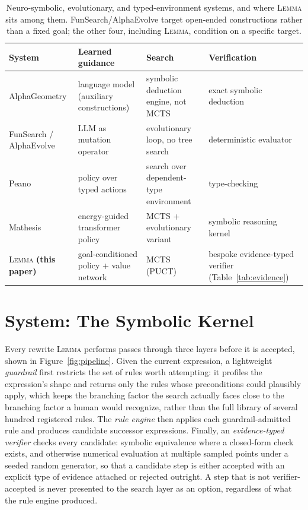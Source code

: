 \documentclass[11pt]{article}
\numberwithin{equation}{section}
\newcommand{\lemma}{\textsc{Lemma}}
\begin{document}
\begin{table}[htbp]
\centering
\small
\begin{tabular}{@{}p{3.4cm}p{3.6cm}p{3.6cm}p{3.6cm}@{}}
\toprule
System & Learned guidance & Search & Verification \\
\midrule
AlphaGeometry \citep{trinh2024alphageometry} & language model (auxiliary constructions) & symbolic deduction engine, not MCTS & exact symbolic deduction \\
FunSearch / AlphaEvolve \citep{romeraparedes2024funsearch,novikov2025alphaevolve} & LLM as mutation operator & evolutionary loop, no tree search & deterministic evaluator \\
Peano \citep{poesia2023peano} & policy over typed actions & search over dependent-type environment & type-checking \\
Mathesis \citep{xie2026mathesis} & energy-guided transformer policy & MCTS + evolutionary variant & symbolic reasoning kernel \\
\lemma{} \textbf{(this paper)} & goal-conditioned policy + value network & MCTS (PUCT) & bespoke evidence-typed verifier (Table~\ref{tab:evidence}) \\
\bottomrule
\end{tabular}
\caption{Neuro-symbolic, evolutionary, and typed-environment systems, and where \lemma{} sits among them. FunSearch/AlphaEvolve target open-ended constructions rather than a fixed goal; the other four, including \lemma{}, condition on a specific target.}
\label{tab:comparison}
\end{table}

\section{System: The Symbolic Kernel}
\label{sec:kernel}

Every rewrite \lemma{} performs passes through three layers before it is accepted, shown in Figure~\ref{fig:pipeline}. Given the current expression, a lightweight \emph{guardrail} first restricts the set of rules worth attempting: it profiles the expression's shape and returns only the rules whose preconditions could plausibly apply, which keeps the branching factor the search actually faces close to the branching factor a human would recognize, rather than the full library of several hundred registered rules. The \emph{rule engine} then applies each guardrail-admitted rule and produces candidate successor expressions. Finally, an \emph{evidence-typed verifier} checks every candidate: symbolic equivalence where a closed-form check exists, and otherwise numerical evaluation at multiple sampled points under a seeded random generator, so that a candidate step is either accepted with an explicit type of evidence attached or rejected outright. A step that is not verifier-accepted is never presented to the search layer as an option, regardless of what the rule engine produced.
\end{document}
